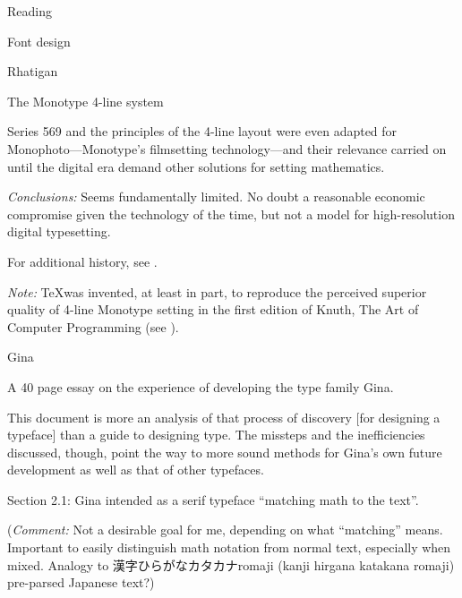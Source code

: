 \documentclass[12pt]{PalisadesLakesBook}
\begin{document}
\begin{plSection}{Reading}
\begin{plSection}{Font design}
\begin{plSection}{Rhatigan}
\begin{plSection}{The Monotype 4-line system}
\begin{plQuote}{}
{}
Series 569 and the principles of the 4-line layout 
were even adapted for Monophoto---Monotype's 
filmsetting technology---and their relevance carried on 
until the digital era demand other solutions 
for setting mathematics.
\end{plQuote}

\emph{Conclusions:}
Seems fundamentally limited. 
No doubt a reasonable economic compromise given the technology of
the time, but not a model for high-resolution digital typesetting.

For additional history, see
.

\emph{Note:} \TeX was invented, at least in part, 
to reproduce the perceived superior quality 
of 4-line Monotype setting
in the first edition of Knuth, The Art of Computer Programming
(see ).

\end{plSection}%
\begin{plSection}{Gina}

\begin{plSection}{}

A 40 page essay on the experience of developing the type family
Gina.

\begin{plQuote}{}{}
This document is more an analysis of that process of discovery
[for designing a typeface]
than a guide to designing type.
The missteps and the inefficiencies discussed, though, 
point the way to more sound methods for 
Gina's own future development as well as that of other typefaces.
\end{plQuote}

Section 2.1: Gina intended as a serif typeface 
``matching math to the text''.

(\emph{Comment:} Not a desirable goal for me, depending
on what ``matching'' means.
Important to easily distinguish math notation from normal text,
especially when mixed. 
Analogy to 漢字\allowbreak ひらがな\allowbreak カタカナ\allowbreak romaji
(kanji hirgana katakana romaji) pre-parsed Japanese text?)



\end{plSection}
\end{plSection}
\end{plSection}
\end{plSection}
\end{plSection}
\end{document}
